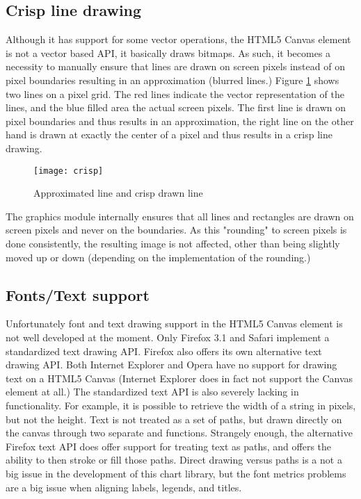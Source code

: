 \subsection{Crisp line drawing}
Although it has support for some vector operations, the HTML5 Canvas element is not a vector based API, it basically draws bitmaps. As such, it becomes a necessity to manually ensure that lines are drawn on screen pixels instead of on pixel boundaries resulting in an approximation\cite{shepherd08} (blurred lines.) Figure \ref{crisp} shows two lines on a pixel grid. The red lines indicate the vector representation of the lines, and the blue filled area the actual screen pixels. The first line is drawn on pixel boundaries and thus results in an approximation, the right line on the other hand is drawn at exactly the center of a pixel and thus results in a crisp line drawing.

\begin{figure}[h!]
\centering
\texttt{[image: crisp]}
\caption{Approximated line and crisp drawn line}
\label{crisp}
\end{figure}

The graphics module internally ensures that all lines and rectangles are drawn on screen pixels and never on the boundaries. As this "rounding" to screen pixels is done consistently, the resulting image is not affected, other than being slightly moved up or down (depending on the implementation of the rounding.)

\subsection{Fonts/Text support}
Unfortunately font and text drawing support in the HTML5 Canvas element is not well developed at the moment. Only Firefox 3.1 and Safari implement a standardized text drawing API. Firefox also offers its own alternative text drawing API. Both Internet Explorer and Opera have no support for drawing text on a HTML5 Canvas (Internet Explorer does in fact not support the Canvas element at all.) The standardized text API is also severely lacking in functionality. For example, it is possible to retrieve the width of a string in pixels, but not the height. Text is not treated as a set of paths, but drawn directly on the canvas through two separate  and  functions. Strangely enough, the alternative Firefox text API does offer support for treating text as paths, and offers the ability to then stroke or fill those paths. Direct drawing versus paths is a not a big issue in the development of this chart library, but the font metrics problems are a big issue when aligning labels, legends, and titles.

